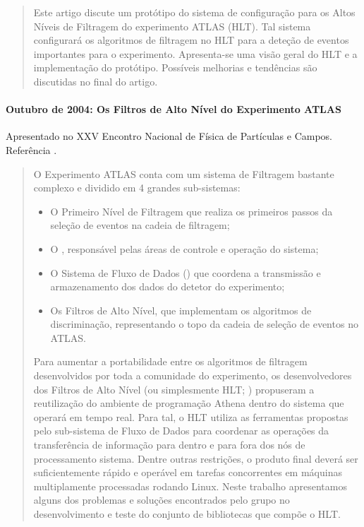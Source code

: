 \begin{quotation}
Este artigo discute um protótipo do sistema de configuração para os Altos
Níveis de Filtragem do experimento ATLAS (HLT). Tal sistema configurará os
algoritmos de filtragem no HLT para a deteção de eventos importantes para o
experimento. Apresenta-se uma visão geral do HLT e a implementação do
protótipo. Possíveis melhorias e tendências são discutidas no final do artigo.
\end{quotation}

\paragraph{Outubro de 2004: Os Filtros de Alto Nível do Experimento ATLAS}
Apresentado no XXV Encontro Nacional de Física de Partículas e
Campos. Referência \cite{aa:enfpc-04}.

\begin{quotation}
O Experimento ATLAS conta com um sistema de Filtragem bastante complexo e
dividido em 4 grandes sub-sistemas:
\begin{itemize}
\item O Primeiro Nível de Filtragem que realiza os primeiros passos da seleção
de eventos na cadeia de filtragem;
\item O , responsável pelas áreas de controle e operação
do sistema; 
\item O Sistema de Fluxo de Dados () que coordena a transmissão
e armazenamento dos dados do detetor do experimento;
\item Os Filtros de Alto Nível, que implementam os algoritmos de
discriminação, representando o topo da cadeia de seleção de eventos no ATLAS.
\end{itemize}
Para aumentar a portabilidade entre os algoritmos de filtragem desenvolvidos
por toda a comunidade do experimento, os desenvolvedores dos Filtros de Alto
Nível (ou simplesmente HLT; ) propuseram a
reutilização do ambiente de programação  Athena dentro do sistema
que operará em tempo real. Para tal, o HLT utiliza as ferramentas propostas
pelo sub-sistema de Fluxo de Dados para coordenar as operações da
transferência de informação para dentro e para fora dos nós de processamento
sistema. Dentre outras restrições, o produto final deverá ser suficientemente
rápido e operável em tarefas concorrentes em máquinas multiplamente
processadas rodando Linux.  Neste trabalho apresentamos alguns dos problemas e
soluções encontrados pelo grupo no desenvolvimento e teste do conjunto de
bibliotecas que compõe o HLT.
\end{quotation}

